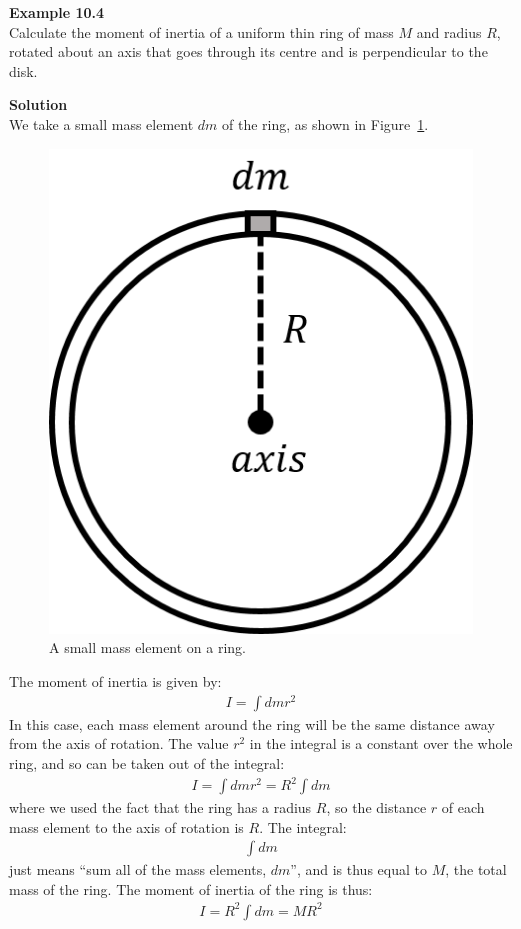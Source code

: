 \begin{framed}
\textbf{Example 10.4}\\
Calculate the moment of inertia of a uniform thin ring of mass $M$ and radius $R$, rotated about an axis that goes through its centre and is perpendicular to the disk.

\begin{framed}
\textbf{Solution}\\
We take a small mass element $dm$ of the ring, as shown in Figure~\ref{fig:rotationaldynamics:ring}.

\begin{figure}[!htbp]
\centering
\includegraphics[width=0.375\linewidth]{files/ring-3798bd4dc72f67da8e9c0035c0b3a36e.png}
\caption[]{A small mass element on a ring.}
\label{fig:rotationaldynamics:ring}
\end{figure}

The moment of inertia is given by:
\begin{align*}
I = \int dm r^2
\end{align*}
In this case, each mass element around the ring will be the same distance away from the axis of rotation. The value $r^2$ in the integral is a constant over the whole ring, and so can be taken out of the integral:
\begin{align*}
I = \int dm r^2 = R^2\int dm
\end{align*}
where we used the fact that the ring has a radius $R$, so the distance $r$ of each mass element to the axis of rotation is $R$. The integral:
\begin{align*}
\int dm
\end{align*}
just means ``sum all of the mass elements, $dm$'', and is thus equal to $M$, the total mass of the ring. The moment of inertia of the ring is thus:
\begin{align*}
I = R^2\int dm = MR^2
\end{align*}
\end{framed}
\end{framed}

